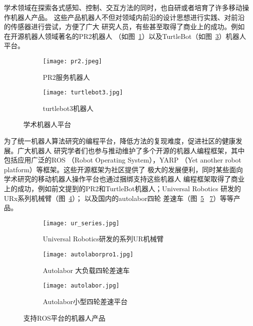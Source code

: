 学术领域在探索各式感知、控制、交互方法的同时，也自研或者培育了许多移动操作机器人产品。
这些产品机器人不但对领域内前沿的设计思想进行实践、对前沿的传感器进行尝试，方便了广大
研究人员，有些甚至取得了商业上的成功。例如在开源机器人领域著名的PR2机器人
（如图~\ref{fig:pr2}）以及TurtleBot（如图~\ref{fig:turtlebot}）机器人平台。

\begin{figure}
\centering
\begin{subfigure}{.6\textwidth}
  \centering
  \texttt{[image: pr2.jpeg]}
  \caption{PR2服务机器人}
  \label{fig:pr2}
\end{subfigure}%
\begin{subfigure}{.4\textwidth}
  \centering
  \texttt{[image: turtlebot3.jpg]}
  \caption{turtlebot3机器人}
  \label{fig:turtlebot}
\end{subfigure}
\caption{学术机器人平台}
\end{figure}

为了统一机器人算法研究的编程平台，降低方法的复现难度，促进社区的健康发展。广大机器人
研究学者们也参与推动维护了多个开源的机器人编程框架，其中包括应用广泛的ROS
（Robot Operating System）\cite{quigley2009ros}，YARP
（Yet another robot platform）\cite{metta2006yarp}等框架。这些开源框架为社区提供了
极大的发展便利，同时某些面向学术研究的移动机器人操作平台也通过捆绑支持这些机器人
编程框架取得了商业上的成功，例如前文提到的PR2和TurtleBot机器人；Universal Robotics
研发的URx系列机械臂（图~\ref{fig:urx}）； 以及国内的autolabor四轮
差速车（图~\ref{fig:autolaborpro1} ~\ref{fig:autolabor}）等等产品。


\begin{figure}
\centering
\begin{subfigure}{.6\textwidth}
  \centering
  \texttt{[image: ur\_series.jpg]}
  \caption{Universal Robotics研发的系列UR机械臂}
  \label{fig:urx}
\end{subfigure}%
\begin{subfigure}{.4\textwidth}
  \centering
  \texttt{[image: autolaborpro1.jpg]}
  \caption{Autolabor 大负载四轮差速车}
  \label{fig:autolaborpro1}
\end{subfigure}
\begin{subfigure}{.5\textwidth}
  \centering
  \texttt{[image: autolabor.jpg]}
  \caption{Autolabor小型四轮差速平台}
  \label{fig:autolabor}
\end{subfigure}
\caption{支持ROS平台的机器人产品}
\end{figure}


